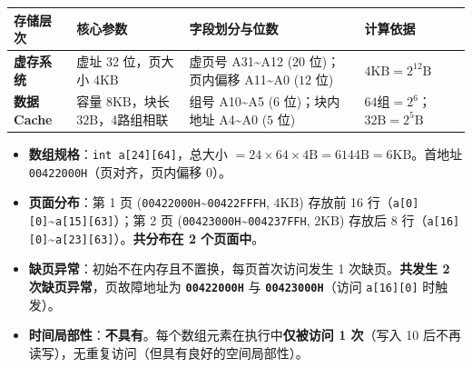 \documentclass[10pt,a4paper]{ctexart}
\begin{document}

\begin{center}\small
\begin{tabularx}{\linewidth}{@{}>{\raggedright\arraybackslash}X>{\raggedright\arraybackslash}X>{\raggedright\arraybackslash}X>{\raggedright\arraybackslash}X@{}}
\toprule
存储层次 & 核心参数 & 字段划分与位数 & 计算依据 \\
\midrule
\textbf{虚存系统} & 虚址 32 位，页大小 $4\mathrm{KB}$ & 虚页号 A31\textasciitilde{}A12 ($20$ 位)；页内偏移 A11\textasciitilde{}A0 ($12$ 位) & $4\mathrm{KB}=2^{12}\mathrm{B}$ \\
\textbf{数据Cache} & 容量 $8\mathrm{KB}$，块长 $32\mathrm{B}$，4路组相联 & 组号 A10\textasciitilde{}A5 ($6$ 位)；块内地址 A4\textasciitilde{}A0 ($5$ 位) & $64\text{组}=2^6$；$32\mathrm{B}=2^5\mathrm{B}$ \\
\bottomrule
\end{tabularx}
\end{center}



\begin{itemize}

\item \textbf{数组规格}：\texttt{int a[24][64]}，总大小 $=24 \times 64 \times 4\mathrm{B}=6144\mathrm{B}=6\mathrm{KB}$。首地址 \texttt{00422000H}（页对齐，页内偏移 0）。

\item \textbf{页面分布}：第 1 页 (\texttt{00422000H}\textasciitilde{}\texttt{00422FFFH}, $4\mathrm{KB}$) 存放前 16 行（\texttt{a[0][0]}\textasciitilde{}\texttt{a[15][63]}）；第 2 页 (\texttt{00423000H}\textasciitilde{}\texttt{004237FFH}, $2\mathrm{KB}$) 存放后 8 行（\texttt{a[16][0]}\textasciitilde{}\texttt{a[23][63]}）。\textbf{共分布在 2 个页面中}。

\item \textbf{缺页异常}：初始不在内存且不置换，每页首次访问发生 1 次缺页。\textbf{共发生 2 次缺页异常}，页故障地址为 \textbf{\texttt{00422000H}} 与 \textbf{\texttt{00423000H}}（访问 \texttt{a[16][0]} 时触发）。

\item \textbf{时间局部性}：\textbf{不具有}。每个数组元素在执行中\textbf{仅被访问 1 次}（写入 10 后不再读写），无重复访问（但具有良好的空间局部性）。

\end{itemize}
\end{document}
